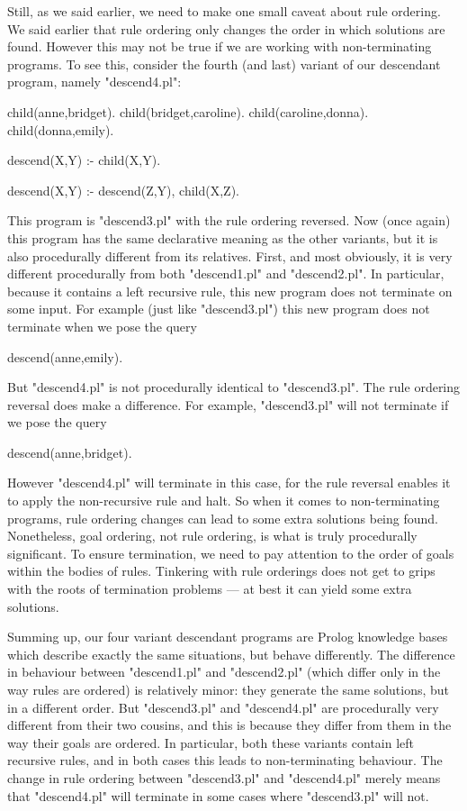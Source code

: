 Still, as we said earlier, we need to make one small caveat about rule
ordering. We said earlier that rule ordering only changes the order in
which solutions are found. However this may not be true
if we are working with non-terminating programs. To see this, consider
the fourth (and last) variant of our descendant program, namely
"descend4.pl":
\begin{LPNcodedisplay}
child(anne,bridget).
child(bridget,caroline).
child(caroline,donna).
child(donna,emily).

descend(X,Y) :- child(X,Y).

descend(X,Y) :- descend(Z,Y),
                 child(X,Z).
\end{LPNcodedisplay}
This program is "descend3.pl" with the rule ordering
reversed.  Now (once again) this program has the same declarative
meaning as the other variants, but it is also procedurally different from
its relatives. First, and most obviously, it is very different
procedurally from both "descend1.pl" and "descend2.pl".  In
particular, because it contains a left recursive rule, this new
program does not terminate on some input.  For example (just like
"descend3.pl") this new program does not terminate when we pose the
query
\begin{LPNcodedisplay}
descend(anne,emily).
\end{LPNcodedisplay}
But "descend4.pl" is not procedurally identical to "descend3.pl".
The rule ordering reversal does make a difference. For example,
"descend3.pl" will not terminate if we pose the query
\begin{LPNcodedisplay}
descend(anne,bridget).
\end{LPNcodedisplay}
However "descend4.pl" will terminate in this case, for the rule
reversal enables it to apply the non-recursive rule and halt. So when
it comes to non-terminating programs, rule ordering changes can lead
to some extra solutions being found. Nonetheless, goal ordering, not
rule ordering, is what is truly procedurally significant.  To ensure
termination, we need to pay attention to the order of goals within the
bodies of rules.  Tinkering with rule orderings does not  get to
grips with the roots of termination problems --- at best it can yield
some extra solutions.

Summing up, our four variant descendant programs are Prolog knowledge
bases which describe exactly the same situations, but behave
differently.  The difference in behaviour between "descend1.pl" and
"descend2.pl" (which differ only in the way rules are ordered) is
relatively minor: they generate the same solutions, but in a different
order.  But "descend3.pl" and "descend4.pl" are procedurally very
different from their two cousins, and this is because they differ from
them in the way their goals are ordered.  In particular, both these
variants contain left recursive rules, and in both cases this leads to
non-terminating behaviour.  The change in rule ordering
between "descend3.pl" and "descend4.pl" merely means that
"descend4.pl" will terminate in some cases where "descend3.pl" will
not.


